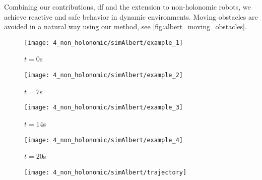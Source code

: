 %
Combining our contributions, \ac{df} and the extension to non-holonomic robots, we
achieve reactive and safe behavior in dynamic environments. Moving obstacles are avoided in a natural way
using our method, see \cref{fig:albert_moving_obstacles}.
%
\begin{figure*}
  \centering
  \begin{subfigure}{.2\linewidth}
    \centering
    \texttt{[image: 4\_non\_holonomic/simAlbert/example\_1]}
  \caption{$t=0$s}
  \end{subfigure}%
  \begin{subfigure}{.2\linewidth}
    \centering
    \texttt{[image: 4\_non\_holonomic/simAlbert/example\_2]}
  \caption{$t=7$s}
  \end{subfigure}%
  \begin{subfigure}{.2\linewidth}
    \centering
    \texttt{[image: 4\_non\_holonomic/simAlbert/example\_3]}
  \caption{$t=14$s}
  \end{subfigure}%
  \begin{subfigure}{.2\linewidth}
    \centering
    \texttt{[image: 4\_non\_holonomic/simAlbert/example\_4]}
  \caption{$t=20$s}
  \end{subfigure}%
  \begin{subfigure}{.2\linewidth}
    \centering
    \texttt{[image: 4\_non\_holonomic/simAlbert/trajectory]}
  \caption{}%
  \label{subfig:albert_moving_obstacles}
  \end{subfigure}
  \caption{Sequence of trajectory computed with \ac{df} for a mobile manipulator in simulation with moving obstacles (red sphere with line indicating the past trajectory) and one end-effector goal (green). The trajectory of the end-effector are 
  visualized in (e) as \x{} and the desired end-effector
  position as \xt{}.
  }%
  \label{fig:albert_moving_obstacles}
\end{figure*}
%
